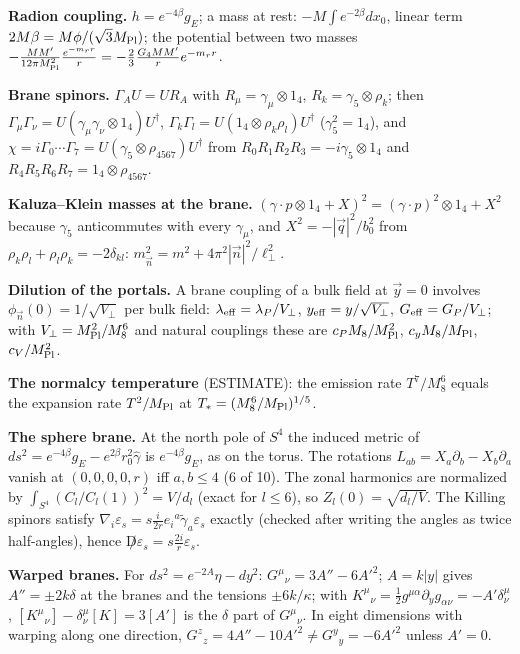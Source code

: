 \documentclass[10pt,a4paper]{article}
\begin{document}
\textbf{Radion coupling.} $h=e^{-4\beta}g_E$; a mass at rest: $-M\int e^{-2\beta}dx_0$, linear term $2M\beta=M\phi/(\sqrt3M_{\rm Pl})$; the potential between two masses $-\frac{MM'}{12\pi M_{\rm Pl}^2}\frac{e^{-m_rr}}r=-\frac23\frac{G_4MM'}re^{-m_rr}$.

\textbf{Brane spinors.} $\Gamma_AU=UR_A$ with $R_\mu=\gamma_\mu\otimes1_4$, $R_k=\gamma_5\otimes\rho_k$; then $\Gamma_\mu\Gamma_\nu=U(\gamma_\mu\gamma_\nu\otimes1_4)U^\dagger$, $\Gamma_k\Gamma_l=U(1_4\otimes\rho_k\rho_l)U^\dagger$ ($\gamma_5^2=1_4$), and $\chi=i\Gamma_0\cdots\Gamma_7=U(\gamma_5\otimes\rho_{4567})U^\dagger$ from $R_0R_1R_2R_3=-i\gamma_5\otimes1_4$ and $R_4R_5R_6R_7=1_4\otimes\rho_{4567}$.

\textbf{Kaluza–Klein masses at the brane.} $(\gamma\cdot p\otimes1_4+X)^2=(\gamma\cdot p)^2\otimes1_4+X^2$ because $\gamma_5$ anticommutes with every $\gamma_\mu$, and $X^2=-|\vec q|^2/b_0^2$ from $\rho_k\rho_l+\rho_l\rho_k=-2\delta_{kl}$: $m_{\vec n}^2=m^2+4\pi^2|\vec n|^2/\ell_\perp^2$.

\textbf{Dilution of the portals.} A brane coupling of a bulk field at $\vec y=0$ involves $\phi_{\vec n}(0)=1/\sqrt{V_\perp}$ per bulk field: $\lambda_{\rm eff}=\lambda_P/V_\perp$, $y_{\rm eff}=y/\sqrt{V_\perp}$, $G_{\rm eff}=G_P/V_\perp$; with $V_\perp=M_{\rm Pl}^2/M_8^6$ and natural couplings these are $c_PM_8/M_{\rm Pl}^2$, $c_yM_8/M_{\rm Pl}$, $c_V/M_{\rm Pl}^2$.

\textbf{The normalcy temperature} (ESTIMATE): the emission rate $T^7/M_8^6$ equals the expansion rate $T^2/M_{\rm Pl}$ at $T_*=(M_8^6/M_{\rm Pl})^{1/5}$.

\textbf{The sphere brane.} At the north pole of $S^4$ the induced metric of $ds^2=e^{-4\beta}g_E-e^{2\beta}r_0^2\hat\gamma$ is $e^{-4\beta}g_E$, as on the torus. The rotations $L_{ab}=X_a\partial_b-X_b\partial_a$ vanish at $(0,0,0,0,r)$ iff $a,b\le4$ (6 of 10). The zonal harmonics are normalized by $\int_{S^4}(C_l/C_l(1))^2=V/d_l$ (exact for $l\le6$), so $Z_l(0)=\sqrt{d_l/V}$. The Killing spinors satisfy $\nabla_i\varepsilon_s=s\frac i{2r}e_i{}^a\tilde\gamma_a\varepsilon_s$ exactly (checked after writing the angles as twice half-angles), hence $\not D\varepsilon_s=s\frac{2i}r\varepsilon_s$.

\textbf{Warped branes.} For $ds^2=e^{-2A}\eta-dy^2$: $G^\mu{}_\nu=3A''-6A'^2$; $A=k|y|$ gives $A''=\pm2k\delta$ at the branes and the tensions $\pm6k/\kappa$; with $K^\mu{}_\nu=\frac12g^{\mu\alpha}\partial_yg_{\alpha\nu}=-A'\delta^\mu_\nu$, $[K^\mu{}_\nu]-\delta^\mu_\nu[K]=3[A']$ is the $\delta$ part of $G^\mu{}_\nu$. In eight dimensions with warping along one direction, $G^z{}_z=4A''-10A'^2\ne G^y{}_y=-6A'^2$ unless $A'=0$.
\end{document}
